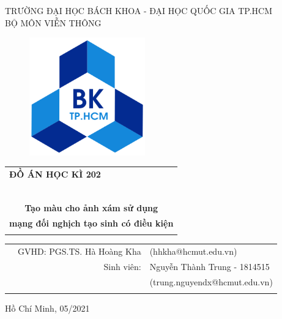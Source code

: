 \documentclass[a4paper, 12pt]{report}
\begin{document}
\begin{titlepage}

\begin{center}
TRƯỜNG ĐẠI HỌC BÁCH KHOA - ĐẠI HỌC QUỐC GIA TP.HCM\\
BỘ MÔN VIỄN THÔNG
\end{center}

\vspace{1cm}

\begin{figure}[!h]
\begin{center}
\includegraphics[width=5cm]{hcmut.png}
\end{center}
\end{figure}

\vspace{1cm}


\begin{center}
\begin{tabular}{c}
\multicolumn{1}{l}{\textbf{{\Large ĐỒ ÁN HỌC KÌ 202}}}\\
~~\\
\hline
\\
\textbf{\Huge Tạo màu cho ảnh xám sử dụng}\\
\textbf{\Huge mạng đối nghịch tạo sinh có điều kiện}\\
\\
\hline
\end{tabular}
\end{center}

\vspace{3cm}

\begin{table}[h]
\begin{tabular}{rrl}

\hspace{2cm} & GVHD: PGS.TS. Hà Hoàng Kha & (hhkha@hcmut.edu.vn)\\
& Sinh viên: & Nguyễn Thành Trung - 1814515\\
& & (trung.nguyendx@hcmut.edu.vn)\\
\vspace{30pt}\\

\end{tabular}
\end{table}

\begin{center}
{\footnotesize Hồ Chí Minh, 05/2021}
\end{center}
\end{titlepage}
\end{document}

